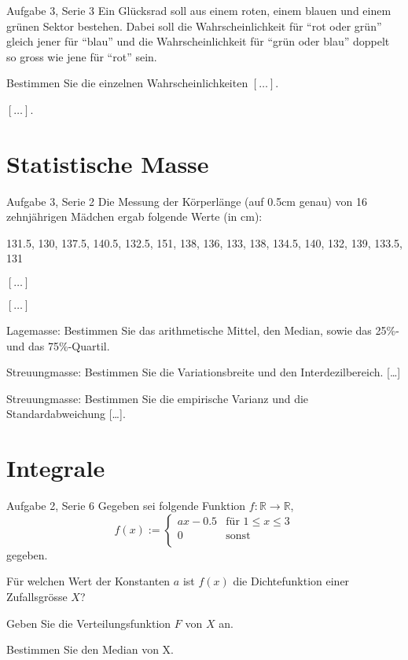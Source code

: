 \documentclass{beamer}
\begin{document}
\begin{frame}{Aufgabe 3, Serie 3}
Ein Glücksrad soll aus einem roten, einem blauen und einem grünen Sektor
bestehen. Dabei soll die Wahrscheinlichkeit für ``rot oder grün'' gleich jener
für ``blau'' und die Wahrscheinlichkeit für ``grün oder blau'' doppelt so gross
wie jene für ``rot'' sein.
\begin{outline}
\item Bestimmen Sie die einzelnen Wahrscheinlichkeiten $[\dots]$.
\item $[\dots]$.
\end{outline}
\end{frame}

\section{Statistische Masse}
\begin{frame}{Aufgabe 3, Serie 2}
Die Messung der Körperlänge (auf 0.5cm genau) von 16 zehnjährigen Mädchen ergab
folgende Werte (in cm):

\begin{center}
131.5, 130, 137.5, 140.5, 132.5, 151, 138, 136, 133, 138, 134.5, 140, 132, 139, 133.5, 131
\end{center}
\begin{outline}
\item $[\dots]$
\item $[\dots]$
\item Lagemasse: Bestimmen Sie das arithmetische Mittel, den Median, sowie das 25\%-
und das 75\%-Quartil.
\item Streuungmasse: Bestimmen Sie die Variationsbreite und den Interdezilbereich. [\dots]
\item Streuungmasse: Bestimmen Sie die empirische Varianz und die Standardabweichung [\dots].
\end{outline}
\end{frame}

\section{Integrale}
\begin{frame}{Aufgabe 2, Serie 6}
Gegeben sei folgende Funktion $f : \mathbb{R }\rightarrow \mathbb{R}$,
$$
f(x):=\begin{cases} ax-0.5 & \text{für } 1 \le x \le 3\\
     0 & \text{sonst}\\
     \end{cases}
$$
gegeben. 
\begin{outline}
\item Für welchen Wert der Konstanten $a$ ist $f(x)$ die Dichtefunktion einer Zufallsgrösse $X$?
\item Geben Sie die Verteilungsfunktion $F$ von $X$ an.
\item Bestimmen Sie den Median von X.
\end{outline}
\end{frame}
\end{document}

